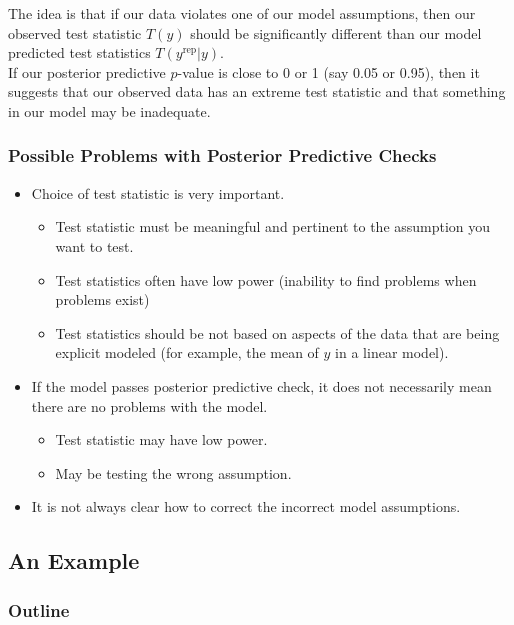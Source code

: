 \documentclass{beamer}
\begin{document}
\begin{frame}
The idea is that if our data violates one of our model assumptions,
then our observed test statistic $T(y)$ should be significantly
different than our model predicted test statistics $T(y^{\mathrm{rep}} | y)$.\\
\bigskip
\pause
If our posterior predictive $p$-value is close to 0 or 1 (say 0.05 or
0.95), then it suggests that our observed data has an extreme test
statistic and that something in our model may be inadequate.
\end{frame}

\begin{frame}
\frametitle{Possible Problems with Posterior Predictive Checks}
\pause
\begin{itemize}
\item Choice of test statistic is very important.
\pause
\begin{itemize}
\item Test statistic must be meaningful and pertinent to the
assumption you want to test.
\pause
\item Test statistics often have low power (inability to find problems
when problems exist)
\pause
\item Test statistics should be not based on aspects of the data that
are being explicit modeled (for example, the mean of $y$ in a linear model).
\end{itemize}
\pause
\medskip
\item If the model passes posterior predictive check, it does not
necessarily mean there are no problems with the model.
\begin{itemize}
\pause
\item Test statistic may have low power.
\pause
\item May be testing the wrong assumption.
\end{itemize}
\pause
\medskip
\item It is not always clear how to correct the incorrect model assumptions.
\end{itemize}
\end{frame}

\subsection{An Example}

\begin{frame}
\frametitle{Outline}
\tableofcontents[currentsubsection]
\end{frame}
\end{document}
